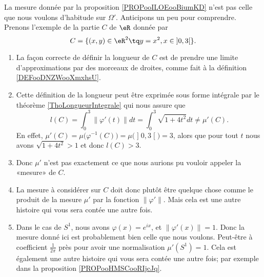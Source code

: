 \begin{remark}     \label{REMooOMYYooNFiKOs}
    La mesure donnée par la proposition \ref{PROPooILOEooBiumKD} n'est pas celle que nous voulons d'habitude sur \( \Omega'\). Anticipons un peu pour comprendre. Prenons l'exemple de la partie \( C\) de \( \eR\) donnée par
    \begin{equation}
        C=\{ (x,y)\in \eR^2\tq y=x^2,x\in \mathopen] 0 , 3 \mathclose[ \}.
    \end{equation}
    \begin{enumerate}
        \item
            La façon correcte de définir la longueur de \( C\) est de prendre une limite d'approximations par des morceaux de droites, comme fait à la définition \ref{DEFooDNZWooXmxhsU}.
        \item
            Cette définition de la longueur peut être exprimée sous forme intégrale par le théorème \ref{ThoLongueurIntegrale} qui nous assure que
            \begin{equation}
                l(C)=\int_0^3\| \varphi'(t) \|dt=\int_0^3\sqrt{ 1+4t^2 }dt\neq \mu'(C).
            \end{equation}
        En effet, \( \mu'(C)=\mu\big( \varphi^{-1}(C) \big)=\mu\big( \mathopen] 0 , 3 \mathclose[ \big)=3\), alors que pour tout \( t\) nous avons \( \sqrt{ 1+4t^2 }>1\) et donc \( l(C)>3\).
        \item
            Donc \( \mu'\) n'est pas exactement ce que nous aurions pu vouloir appeler la «mesure» de \( C\).
        \item
            La mesure à considérer sur \( C\) doit donc plutôt être quelque chose comme le produit de la mesure \( \mu'\) par la fonction \( \| \varphi' \|\). Mais cela est une autre histoire qui vous sera contée une autre fois.
        \item       \label{ITEMooJTKCooYQknqo}
            Dans le cas de \( S^1\), nous avons \( \varphi(x)= e^{ix}\), et \( \| \varphi'(x) \|=1\). Donc la mesure donné ici est probablement bien celle que nous voulons. Peut-être à coefficient \( \frac{1}{ 2\pi }\) près pour avoir une normalisation \( \mu'(S^1)=1\). Cela est également une autre histoire qui vous sera contée une autre fois; par exemple dans la proposition \ref{PROPooHMSCooRIjcJq}.
    \end{enumerate}
\end{remark}

